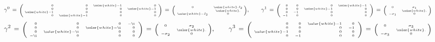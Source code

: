 
\begin{equation*}
\gamma^{0}
\,=\,
	\textnormal{\tiny$\left(\!\!\begin{array}{rrrr}
		0 & 0 & {\color{white}-}1 & 0 \\
		0 & 0 & 0 & {\color{white}-}1 \\
		{\color{white}-}1 & 0 & 0 & 0 \\
		0 & {\color{white}-}1 & 0 & 0
		\end{array}\!\right)$}
\,=\,
	\textnormal{\tiny$\left(\!\begin{array}{cc}
		0 & {\color{white}.}I_{2} \\
		{\color{white}-}I_{2} & \overset{{\color{white}.}}{0} \\
		\end{array}\!\!\right)$},
\quad\quad
\gamma^{1}
\,=\,
	\textnormal{\tiny$\left(\!\begin{array}{rrrr}
		0 & 0 & 0 & {\color{white}-}1 \\
		0 & 0 & {\color{white}-}1 & 0 \\
		0 & -1 & 0 & 0 \\
		-1 & 0 & 0 & 0
		\end{array}\right)$}
\,=\,
	\textnormal{\tiny$\left(\!\begin{array}{cc}
		0 & \sigma_{1} \\
		-\sigma_{1} & \overset{{\color{white}.}}{0} \\
		\end{array}\!\!\right)$}
\end{equation*}
\begin{equation*}
\gamma^{2}
\,=\,
	\textnormal{\tiny$\left(\!\begin{array}{rrrr}
		0 & 0 & 0 & -\i \\
		0 & 0 & {\color{white}-}\i & 0 \\
		0 & {\color{white}-}\i & 0 & 0 \\
		-\i & 0 & 0 & 0
		\end{array}\right)$}
\,=\,
	\textnormal{\tiny$\left(\!\begin{array}{cc}
		0 & \sigma_{2} \\
		-\sigma_{2} & \overset{{\color{white}.}}{0} \\
		\end{array}\!\!\right)$},
\quad\quad
\gamma^{3}
\,=\,
	\textnormal{\tiny$\left(\!\begin{array}{rrrr}
		0 & 0 & {\color{white}-}1 & 0\\
		0 & 0 & 0 & -1 \\
		{\color{white}-}1 & 0 & 0 & 0 \\
		0 & -1 & 0 & 0
		\end{array}\right)$}
\,=\,
	\textnormal{\tiny$\left(\!\begin{array}{cc}
		0 & \sigma_{3} \\
		-\sigma_{3} & \overset{{\color{white}.}}{0} \\
		\end{array}\!\!\right)$}
\end{equation*}
